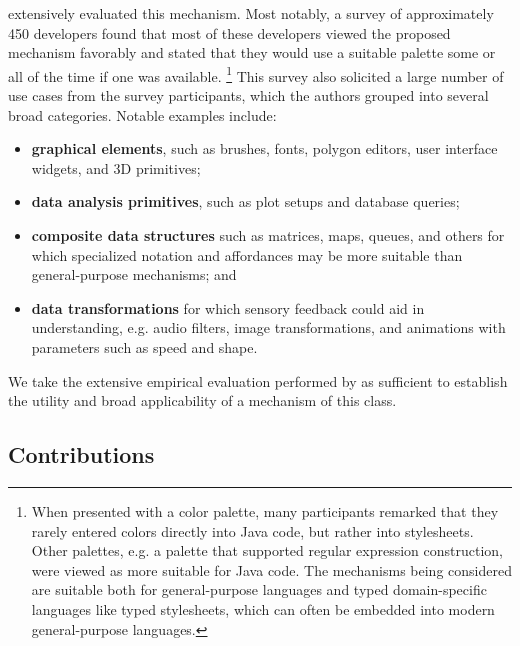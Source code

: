 \citet{Graphite} extensively evaluated this mechanism.
Most notably, a survey of approximately 450 developers found that
most of these developers viewed the proposed mechanism favorably and stated that they
would use a suitable palette some or all of the time if one was available.%
\footnote{When presented with a color palette,
many participants remarked that they rarely entered colors directly into Java code,
but rather into stylesheets.
Other palettes, e.g. a palette
that supported regular expression construction, were viewed as more
suitable for Java code.
The mechanisms being considered are suitable both for general-purpose languages
and typed domain-specific languages like typed stylesheets, which can often be embedded into modern
general-purpose languages.}
This survey also solicited a large number of use cases from the survey participants,
which the authors grouped into several broad categories. Notable examples include:
\begin{itemize}
  \item \textbf{graphical elements}, such as brushes, fonts, polygon editors, user interface widgets, and 3D primitives;
  \item \textbf{data analysis primitives}, such as plot setups and database queries;
  \item \textbf{composite data structures} such as matrices, maps, queues, and others for which specialized notation and affordances may be more suitable than general-purpose mechanisms; and
  \item \textbf{data transformations} for which sensory feedback could aid in understanding,
  e.g. audio filters, image transformations, and animations with parameters such as speed and shape.
\end{itemize}

We take the extensive empirical evaluation performed by \citet{Graphite} as sufficient to establish
the utility and broad applicability of a mechanism of this class.

\subsection{Contributions}

